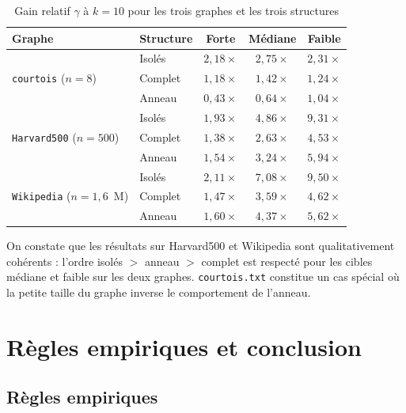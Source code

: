 \documentclass[12pt,a4paper]{article}
\theoremstyle{definition}
\begin{document}
\begin{table}[H]
\centering
\caption{Gain relatif $\gamma$ \`{a} $k=10$ pour les trois graphes et les trois structures}
\label{tab:comparaison_k10}
\small
\begin{tabular}{llccc}
\toprule
\textbf{Graphe} & \textbf{Structure} & \textbf{Forte} & \textbf{M\'{e}diane} & \textbf{Faible} \\
\midrule
\multirow{3}{*}{\texttt{courtois} ($n=8$)}
 & Isol\'{e}s  & $2{,}18\times$ & $2{,}75\times$ & $2{,}31\times$ \\
 & Complet & $1{,}18\times$ & $1{,}42\times$ & $1{,}24\times$ \\
 & Anneau  & $0{,}43\times$ & $0{,}64\times$ & $1{,}04\times$ \\
\midrule
\multirow{3}{*}{\texttt{Harvard500} ($n=500$)}
 & Isol\'{e}s  & $1{,}93\times$ & $4{,}86\times$ & $9{,}31\times$ \\
 & Complet & $1{,}38\times$ & $2{,}63\times$ & $4{,}53\times$ \\
 & Anneau  & $1{,}54\times$ & $3{,}24\times$ & $5{,}94\times$ \\
\midrule
\multirow{3}{*}{\texttt{Wikipedia} ($n=1{,}6$~M)}
 & Isol\'{e}s  & $2{,}11\times$ & $7{,}08\times$ & $9{,}50\times$ \\
 & Complet & $1{,}47\times$ & $3{,}59\times$ & $4{,}62\times$ \\
 & Anneau  & $1{,}60\times$ & $4{,}37\times$ & $5{,}62\times$ \\
\bottomrule
\end{tabular}
\end{table}

\noindent On constate que les r\'{e}sultats sur Harvard500 et Wikipedia sont qualitativement
coh\'{e}rents : l'ordre isol\'{e}s $>$ anneau $>$ complet est respect\'{e} pour les cibles
m\'{e}diane et faible sur les deux graphes. \texttt{courtois.txt} constitue un cas
sp\'{e}cial o\`{u} la petite taille du graphe inverse le comportement de l'anneau.

\section{R\`{e}gles empiriques et conclusion}

\subsection{R\`{e}gles empiriques}
\end{document}
